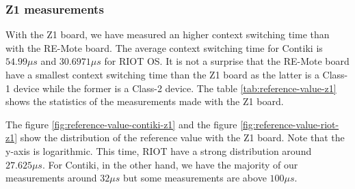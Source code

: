 \subsubsection{Z1 measurements}
With the Z1 board, we have measured an higher context switching time than with the RE-Mote board. The average context switching time for Contiki is $54.99\mu s$ and $30.6971 \mu s$ for RIOT OS.
It is not a surprise that the RE-Mote board have a smallest context switching time than the Z1 board as the latter is a Class-1 device while the former is a Class-2 device.
The table \ref{tab:reference-value-z1} shows the statistics of the measurements made with the Z1 board.



The figure \ref{fig:reference-value-contiki-z1} and the figure \ref{fig:reference-value-riot-z1} show the distribution of the reference value with the Z1 board.
Note that the y-axis is logarithmic.
This time, RIOT have a strong distribution around $27.625\mu s$.
For Contiki, in the other hand, we have the majority of our measurements around $32\mu s$ but some measurements are above $100 \mu s$.

